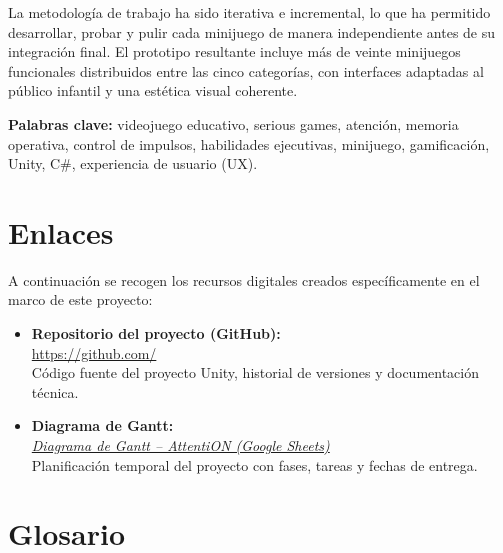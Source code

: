 \documentclass[12pt, a4paper]{report}
\begin{document}
La metodología de trabajo ha sido iterativa e incremental, lo que ha permitido
desarrollar, probar y pulir cada minijuego de manera independiente antes de su
integración final. El prototipo resultante incluye más de veinte minijuegos
funcionales distribuidos entre las cinco categorías, con interfaces adaptadas
al público infantil y una estética visual coherente.

\bigskip
\textbf{Palabras clave:} videojuego educativo, serious games, atención, memoria operativa,
control de impulsos, habilidades ejecutivas, minijuego, gamificación, Unity, C\#,
experiencia de usuario (UX).

\chapter*{Enlaces}

A continuación se recogen los recursos digitales creados específicamente en el
marco de este proyecto:

\begin{itemize}
  \item \textbf{Repositorio del proyecto (GitHub):}\\
    \url{https://github.com/} \\
    Código fuente del proyecto Unity, historial de versiones y documentación
    técnica.

  \item \textbf{Diagrama de Gantt:}\\
    \href{https://docs.google.com/spreadsheets/d/19SBDgHSgRw6bz_plAlHYkfWy23hx8tOTT-GIoEdbngE/edit?usp=sharing}{\textit{Diagrama de Gantt -- AttentiON (Google Sheets)}}\\
    Planificación temporal del proyecto con fases, tareas y fechas de entrega.
\end{itemize}

\listoftables
{}

\listoffigures
{}

\chapter*{Glosario}
\end{document}
